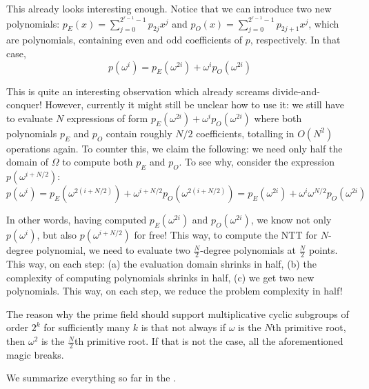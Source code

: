 \documentclass[../../book.tex]{subfiles}
\begin{document}
This already looks interesting enough. Notice that we can introduce two new polynomials: $p_E(x)=\sum_{j=0}^{2^{r-1}-1}p_{2j}x^{j}$ and $p_O(x)=\sum_{j=0}^{2^{r-1}-1}p_{2j+1}x^{j}$, 
which are polynomials, containing even and odd coefficients of $p$, respectively. In that case, 
\begin{equation*}
    p(\omega^i) = p_E(\omega^{2i}) + \omega^i p_O(\omega^{2i})
\end{equation*}

This is quite an interesting observation which already screams
divide-and-conquer! However, currently it might still be unclear 
how to use it: we still have to evaluate $N$ expressions of 
form $p_E(\omega^{2i}) + \omega^i p_O(\omega^{2i})$ where both 
polynomials $p_E$ and $p_O$ contain roughly $N/2$ coefficients, totalling 
in $O(N^2)$ operations again. To counter this, we claim the following: 
we need only half the domain of $\Omega$ to compute both $p_E$ and $p_O$.
To see why, consider the expression $p(\omega^{i+N/2})$:
\begin{equation*}
    p(\omega^i) = p_E(\omega^{2(i+N/2)}) + \omega^{i+N/2}p_O(\omega^{2(i+N/2)}) = p_E(\omega^{2i}) + \omega^{i}\omega^{N/2}p_O(\omega^{2i})
\end{equation*}

In other words, having computed $p_E(\omega^{2i})$ and $p_O(\omega^{2i})$, we
know not only $p(\omega^i)$, but also $p(\omega^{i+N/2})$ for free! This way, to
compute the \textsf{NTT} for $N$-degree polynomial, we need to evaluate two
$\frac{N}{2}$-degree polynomials at $\frac{N}{2}$ points. This way, on each
step: (a) the evaluation domain shrinks in half, (b) the complexity of computing
polynomials shrinks in half, (c) we get two new polynomials. This way, on each
step, we reduce the problem complexity in half!

The reason why the prime field should support multiplicative cyclic subgroups 
of order $2^k$ for sufficiently many $k$ is that not always if $\omega$ is the 
$N$th primitive root, then $\omega^2$ is the $\frac{N}{2}$th primitive root. If that is 
not the case, all the aforementioned magic breaks.

We summarize everything so far in the .
\end{document}
